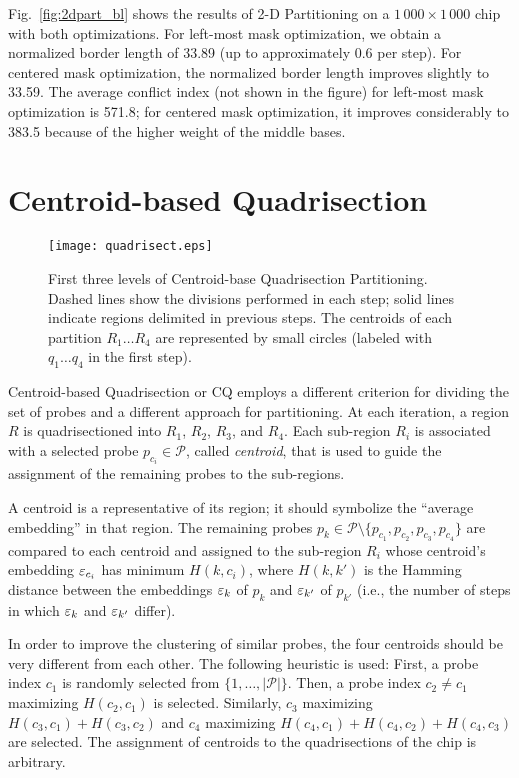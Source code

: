 Fig.~\ref{fig:2dpart_bl} shows the results of 2-D Partitioning on a
$1\,000\times 1\,000$ chip with both optimizations. For left-most mask
optimization, we obtain a normalized border length of 33.89 (up to
approximately 0.6 per step). For centered mask optimization, the normalized
border length improves slightly to 33.59. The average conflict index (not
shown in the figure) for left-most mask optimization is 571.8; for centered
mask optimization, it improves considerably to 383.5 because of the higher
weight of the middle bases.


\section{Centroid-based Quadrisection}
\label{sec:part_cq}

\begin{figure}\centering
\texttt{[image: quadrisect.eps]}
\caption{\label{fig:quadrisect}%
  First three levels of Centroid-base Quadrisection Partitioning. Dashed lines
  show the divisions performed in each step; solid lines indicate regions
  delimited in previous steps. The centroids of each partition $R_1 \dots R_4$
  are represented by small circles (labeled with $q_1 \dots q_4$ in the first
  step).}
\end{figure}

Centroid-based Quadrisection or CQ \citep{Kahng2003a} employs a
different criterion for dividing the set of probes and a different
approach for partitioning. At each iteration, a region $R$ is
quadrisectioned into $R_1$, $R_2$, $R_3$, and $R_4$. Each sub-region
$R_i$ is associated with a selected probe $p_{c_i}\in \mathcal{P}$,
called \emph{centroid}, that is used to guide the assignment of the
remaining probes to the sub-regions.

A centroid is a representative of its region; it should symbolize the
``average embedding'' in that region. The remaining probes $p_k \in
\mathcal{P} \setminus \{p_{c_1},p_{c_2},p_{c_3},p_{c_4}\}$ are
compared to each centroid and assigned to the sub-region $R_i$ whose
centroid's embedding $\varepsilon_{c_i}$ has minimum $H(k,c_i)$, where
$H(k,k')$ is the Hamming distance between the embeddings $\varepsilon_k$ of
$p_k$ and $\varepsilon_{k'}$ of $p_{k'}$ (i.e., the number of steps in which
$\varepsilon_k$ and $\varepsilon_{k'}$ differ).

In order to improve the clustering of similar probes, the four
centroids should be very different from each other. The following
heuristic is used: First, a probe index $c_1$ is randomly selected
from $\{1,\dots,|\mathcal{P}|\}$.  Then, a probe index $c_2\neq c_1$
maximizing $H(c_2,c_1)$ is selected.  Similarly, $c_3$ maximizing
$H(c_3,c_1) + H(c_3,c_2)$ and $c_4$ maximizing $H(c_4,c_1) +
H(c_4,c_2) + H(c_4,c_3)$ are selected.  The assignment of centroids to
the quadrisections of the chip is arbitrary.

